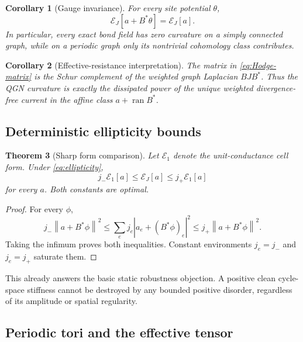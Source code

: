\documentclass[11pt]{article}
\newtheorem{theorem}{Theorem}[section]
\newtheorem{corollary}[theorem]{Corollary}
\theoremstyle{definition}
\theoremstyle{remark}
\newcommand{\cE}{\mathcal E}
\newcommand{\ran}{\operatorname{ran}}
\newcommand{\norm}[1]{\left\lVert #1\right\rVert}
\newcommand{\abs}[1]{\left\lvert #1\right\rvert}
\begin{document}
\begin{corollary}[Gauge invariance]
\label{cor:gauge}
For every site potential $\theta$,
\begin{equation}
 \cE_J[a+B^*\theta]=\cE_J[a].
\end{equation}
In particular, every exact bond field has zero curvature on a simply connected graph, while on a periodic graph only its nontrivial cohomology class contributes.
\end{corollary}

\begin{corollary}[Effective-resistance interpretation]
\label{cor:resistance}
The matrix in \eqref{eq:Hodge-matrix} is the Schur complement of the weighted graph Laplacian $BJB^*$.  Thus the QGN curvature is exactly the dissipated power of the unique weighted divergence-free current in the affine class $a+\ran B^*$.
\end{corollary}

\subsection{Deterministic ellipticity bounds}

\begin{theorem}[Sharp form comparison]
\label{thm:ellipticity}
Let $\cE_1$ denote the unit-conductance cell form.  Under \eqref{eq:ellipticity},
\begin{equation}
 \boxed{
 j_-\cE_1[a]\le\cE_J[a]\le j_+\cE_1[a]}
 \label{eq:ellipticity-form}
\end{equation}
for every $a$.  Both constants are optimal.
\end{theorem}

\begin{proof}
For every $\phi$,
\[
 j_-\norm{a+B^*\phi}^2
 \le\sum_ej_e\abs{a_e+(B^*\phi)_e}^2
 \le j_+\norm{a+B^*\phi}^2.
\]
Taking the infimum proves both inequalities.  Constant environments $j_e=j_-$ and $j_e=j_+$ saturate them.
\end{proof}

This already answers the basic static robustness objection.  A positive clean cycle-space stiffness cannot be destroyed by any bounded positive disorder, regardless of its amplitude or spatial regularity.

\subsection{Periodic tori and the effective tensor}
\end{document}
